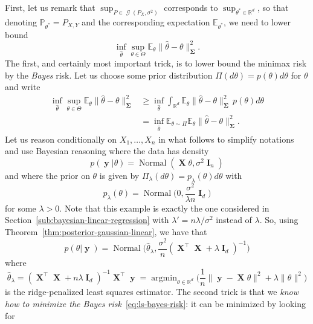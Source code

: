 \documentclass[
	fontsize=11pt, %
	twoside=false, %
	numbers=noenddot, %
]{kaobook}
\DeclareMathOperator{\cG}{{\mathcal G}}
\DeclareMathOperator{\bI}{{\boldsymbol I}}
\DeclareMathOperator{\bX}{{\boldsymbol X}}
\DeclareMathOperator{\by}{{\boldsymbol y}}
\DeclareMathOperator{\bSigma}{\boldsymbol \Sigma}
\DeclareMathOperator{\nor}{Normal}
\DeclareMathOperator*{\argmin}{argmin}
\renewcommand{\P}{\mathbb P}
\newcommand{\E}{\mathbb E}
\newcommand{\R}{\mathbb R}
\newcommand{\wh}{\widehat}
\newcommand{\norm}[1]{\| #1 \|}
\begin{document}
First, let us remark that $\sup_{P \in \cG(P_X, \sigma^2)}$ corresponds to $\sup_{\theta^* \in \R^d}$, so that denoting $\P_{\theta^*} = P_{X, Y}$ and the corresponding expectation $\E_{\theta^*}$, we need to lower bound
\begin{equation*}
	\inf_{\wh \theta} \sup_{\theta \in \Theta} \E_\theta \norm{\wh \theta - \theta}_{\bSigma}^2.
\end{equation*}
The first, and certainly most important trick, is to lower bound the minimax risk by the \emph{Bayes} risk. 
Let us choose some prior distribution $\Pi(d \theta) = p(\theta) d \theta$ for $\theta$ and write
\begin{align}
	\nonumber
	\inf_{\wh \theta} \sup_{\theta \in \Theta} \E_\theta \norm{\wh \theta - \theta}_{\bSigma}^2 
	&\geq \inf_{\wh \theta} \int_{\R^d} \E_\theta \norm{\wh \theta - \theta}_{\bSigma}^2 \, p(\theta) d \theta \\
	\label{eq:ls-bayes-risk}
	&= \inf_{\wh \theta} \E_{\theta \sim \Pi} \E_\theta \norm{\wh \theta - \theta}_{\bSigma}^2.
\end{align}
Let us reason conditionally on $X_1, \ldots, X_n$ in what follows to simplify notations and use Bayesian reasoning where the data has density 
\begin{equation*}
	p(\by | \theta) = \nor(\bX \theta, \sigma^2 \bI_n)
\end{equation*}
and where the prior on $\theta$ is given by $\Pi_\lambda(d \theta) = p_\lambda(\theta) d\theta$ with
\begin{equation*}
	p_\lambda(\theta) = \nor\Big(0, \frac{\sigma^2}{\lambda n} \bI_d \Big)
\end{equation*}
for some $\lambda > 0$. Note that this example is exactly the one considered in Section~\ref{sub:bayesian-linear-regression} with $\lambda' = n \lambda / \sigma^2$ instead of $\lambda$.
So, using Theorem~\ref{thm:posterior-gaussian-linear}, we have that
\begin{equation*}
	p(\theta | \by) = \nor\Big( \wh \theta_\lambda, \frac{\sigma^2}{n} (\bX^\top \bX + \lambda \bI_d)^{-1} \Big)
\end{equation*}
where
\begin{equation*}
	\wh \theta_\lambda = (\bX^\top \bX + n \lambda \bI_d)^{-1} \bX^\top \by = 
	\argmin_{\theta \in \R^d} \Big( \frac 1n \norm{\by - \bX \theta}^2 + \lambda \norm{\theta}^2 \Big)
\end{equation*}
is the ridge-penalized least squares estimator.
The second trick is that we \emph{know how to minimize the Bayes risk}~\eqref{eq:ls-bayes-risk}: it can be minimized by looking for
\end{document}

